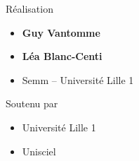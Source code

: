 \begin{frame}
\begin{minipage}{0.45\textwidth}
  \medskip

  Réalisation
  \begin{itemize}
    \item {\bf Guy Vantomme}
    \item {\bf Léa Blanc-Centi}
    \item Semm -- Université Lille 1
  \end{itemize}

  \medskip

  Soutenu par 
  \begin{itemize}
    \item Université Lille 1
    \item Unisciel
  \end{itemize}

  \end{minipage}  



\end{frame}


